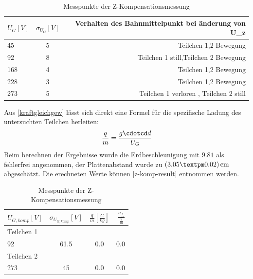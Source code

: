 \documentclass[a4paper,12pt]{article}
\begin{document}
	\begin{table}
	\centering
	\begin{tabular}{ l | c | r }
		$U_{G} [V]$ & $\sigma_{U_{G}}[V]$ & Verhalten des Bahnmittelpunkt bei änderung von U_z  \\
		\hline
		45 & 5 & Teilchen 1,2 Bewegung   \\
		92 & 8 & Teilchen 1 still,Teilchen 2 Bewegung \\
		168 & 4 & Teilchen 1,2 Bewegung    \\
		228 & 3 & Teilchen 1,2 Bewegung \\
		273 & 5 & Teilchen 1 verloren , Teilchen 2 still \\
	\end{tabular}
\caption{Messpunkte der Z-Kompensationsmessung}
\label{tab:z-komp-measure}
\end{table}
Aus \ref{kraftgleichgew} lässt sich direkt eine Formel für die spezifische Ladung des untersuchten Teilchen herleiten:
\begin{align*}\label{zspezm}
	\frac{q}{m} = \frac{g\cdotcd  d}{U_{G}}
\end{align*}
Beim berechnen der Ergebnisse wurde die Erdbeschleunigung mit $9.81$ als fehlerfrei angenommen, der Plattenabstand wurde zu $\unit[(3.05±0.02)]{cm}$ abgeschätzt. 
Die erechneten Werte können \ref{z-komp-result} entnommen werden.

	\begin{table}
	\centering
	\begin{tabular}{ l | c | c| r }
		$U_{G,komp} [V]$ & $\sigma_{U_{G,komp}}[V]$ & $\frac{q}{m}[\frac{C}{kg}]$ & $\frac{\sigma_{\frac{q}{m}}}{\frac{q}{m}}$  \\
		\hline
		\hline
		Teilchen 1 \\
		92 & 61.5 & 0.0 & 0.0 \\
		\hline
		Teilchen 2 \\
		273 & 45 & 0.0 & 0.0 \\
	\end{tabular}
\caption{Messpunkte der Z-Kompensationsmessung}
\label{tab:z-komp-result}
\end{table}
\end{document}
